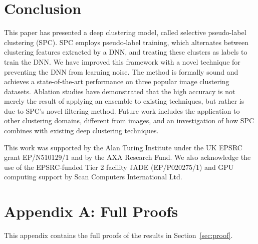 \documentclass[runningheads]{llncs}
\begin{document}
 \section{Conclusion} \label{sec:conclusion}
This paper has presented a deep clustering model, called selective pseudo-label clustering (SPC). SPC employs pseudo-label training, which alternates between clustering features extracted by a DNN, and treating these clusters as labels to train the DNN. We have improved this framework  with a novel technique for preventing the DNN from learning noise. The method is formally sound and achieves a state-of-the-art performance on three popular image clustering datasets. Ablation studies have demonstrated that the high accuracy is not merely the result of applying an ensemble to existing techniques, but rather is due to SPC's novel filtering method. Future work includes the application to other clustering domains, different from images, and an investigation of how SPC combines with existing deep clustering techniques. 

\medskip 
{}This work was supported by the Alan Turing Institute
under the UK EPSRC grant EP/N510129/1 and by the AXA
Research Fund.  We also acknowledge the use of
the EPSRC-funded Tier 2 facility JADE (EP/P020275/1) and
GPU computing support by Scan Computers International Ltd. 



\newpage
\section{Appendix A: Full Proofs}
This appendix contains the full proofs of the results in Section~\ref{sec:proof}. 
\end{document}

